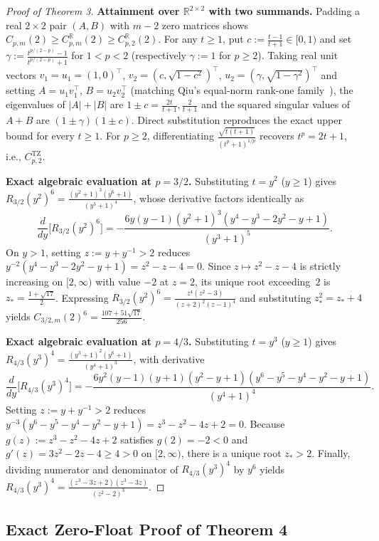 \documentclass[10pt,letterpaper]{article}
\newcommand{\R}{\mathbb{R}}
\newcommand{\TZ}{\mathrm{TZ}}
\begin{document}
\begin{proof}[Proof of Theorem 3]
\textbf{Attainment over $\R^{2\times 2}$ with two summands.} Padding a real $2\times 2$ pair $(A, B)$ with $m-2$ zero matrices shows $C_{p,m}(2) \ge C_{p,m}^{\R}(2) \ge C_{p,2}^{\R}(2)$. For any $t \ge 1$, put $c := \frac{t-1}{t+1} \in [0,1)$ and set $\gamma := \frac{t^{p/(2-p)} - 1}{t^{p/(2-p)} + 1}$ for $1 < p < 2$ (respectively $\gamma := 1$ for $p \ge 2$). Taking real unit vectors $v_1 = u_1 = (1,0)^\top$, $v_2 = (c, \sqrt{1-c^2})^\top$, $u_2 = (\gamma, \sqrt{1-\gamma^2})^\top$ and setting $A = u_1 v_1^\top$, $B = u_2 v_2^\top$ (matching Qiu's equal-norm rank-one family~\cite[\S5]{Qiu2026}), the eigenvalues of $|A|+|B|$ are $1 \pm c = \frac{2t}{t+1}, \frac{2}{t+1}$ and the squared singular values of $A+B$ are $(1\pm\gamma)(1\pm c)$. Direct substitution reproduces the exact upper bound for every $t \ge 1$. For $p \ge 2$, differentiating $\frac{\sqrt{t(t+1)}}{(t^p+1)^{1/p}}$ recovers $t^p = 2t + 1$, i.e., $C_{p,2}^{\TZ}$.

\textbf{Exact algebraic evaluation at $p = 3/2$.} Substituting $t = y^2$ ($y \ge 1$) gives $R_{3/2}(y^2)^6 = \frac{(y^2+1)^3(y^6+1)}{(y^3+1)^4}$, whose derivative factors identically as
\[
  \frac{d}{dy}\bigl[R_{3/2}(y^2)^6\bigr] = -\frac{6y(y-1)(y^2+1)^3(y^4 - y^3 - 2y^2 - y + 1)}{(y^3+1)^5}.
\]
On $y > 1$, setting $z := y + y^{-1} > 2$ reduces $y^{-2}(y^4 - y^3 - 2y^2 - y + 1) = z^2 - z - 4 = 0$. Since $z \mapsto z^2 - z - 4$ is strictly increasing on $[2,\infty)$ with value $-2$ at $z = 2$, its unique root exceeding~$2$ is $z_* = \frac{1+\sqrt{17}}{2}$. Expressing $R_{3/2}(y^2)^6 = \frac{z^4(z^2-3)}{(z+2)^2(z-1)^4}$ and substituting $z_*^2 = z_* + 4$ yields $C_{3/2,m}(2)^6 = \frac{107 + 51\sqrt{17}}{256}$.

\textbf{Exact algebraic evaluation at $p = 4/3$.} Substituting $t = y^3$ ($y \ge 1$) gives $R_{4/3}(y^3)^4 = \frac{(y^3+1)^2(y^6+1)}{(y^4+1)^3}$, with derivative
\[
  \frac{d}{dy}\bigl[R_{4/3}(y^3)^4\bigr] = -\frac{6y^2(y-1)(y+1)(y^2-y+1)(y^6 - y^5 - y^4 - y^2 - y + 1)}{(y^4+1)^4}.
\]
Setting $z := y + y^{-1} > 2$ reduces $y^{-3}(y^6 - y^5 - y^4 - y^2 - y + 1) = z^3 - z^2 - 4z + 2 = 0$. Because $g(z) := z^3 - z^2 - 4z + 2$ satisfies $g(2) = -2 < 0$ and $g'(z) = 3z^2 - 2z - 4 \ge 4 > 0$ on $[2,\infty)$, there is a unique root $z_* > 2$. Finally, dividing numerator and denominator of $R_{4/3}(y^3)^4$ by $y^6$ yields $R_{4/3}(y^3)^4 = \frac{(z^3 - 3z + 2)(z^3 - 3z)}{(z^2 - 2)^3}$.
\end{proof}

\subsection{Exact Zero-Float Proof of Theorem 4}
\end{document}
